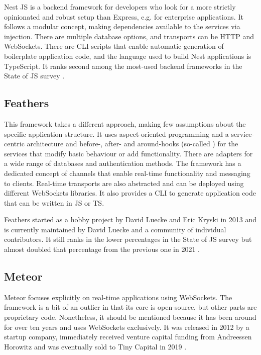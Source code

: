 Nest JS is a backend framework for developers who look for a more strictly opinionated and robust setup than Express, e.g. for enterprise applications. It follows a modular concept, making dependencies available to the services via injection. There are multiple database options, and transports can be HTTP and WebSockets. There are \ac{CLI} scripts that enable automatic generation of boilerplate application code, and the language used to build Nest applications is TypeScript. It ranks second among the most-used backend frameworks in the State of JS survey \parencite{mostUsedBackendFrameworks22}.

\subsection{Feathers}

This framework takes a different approach, making few assumptions about the specific application structure. It uses aspect-oriented programming and a service-centric architecture and before-, after- and around-hooks (so-called ) for the services that modify basic behaviour or add functionality. There are adapters for a wide range of databases and authentication methods. The framework has a dedicated concept of channels that enable real-time functionality and messaging to clients. Real-time transports are also abstracted and can be deployed using different WebSockets libraries. It also provides a \ac{CLI} to generate application code that can be written in \ac{JS} or \ac{TS}.

Feathers started as a hobby project by David Luecke and Eric Kryski in 2013 \parencite{feathersFrameworkHistory} and is currently maintained by David Luecke and a community of individual contributors. It still ranks in the lower percentages in the State of JS survey but almost doubled that percentage from the previous one in 2021 \parencite{mostUsedBackendFrameworks21}.

\subsection{Meteor}

Meteor focuses explicitly on real-time applications using WebSockets. The framework is a bit of an outlier in that its core is open-source, but other parts are proprietary code. Nonetheless, it should be mentioned because it has been around for over ten years and uses WebSockets exclusively. It was released in 2012 by a startup company, immediately received venture capital funding from Andreessen Horowitz and was eventually sold to Tiny Capital in 2019 \parencite{meteorSaleTinyCapital}.

